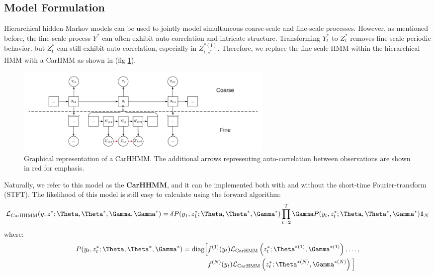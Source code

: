 

\subsection{Model Formulation}
\label{subsec:model_structure}

Hierarchical hidden Markov models can be used to jointly model simultaneous coarse-scale and fine-scale processes. However, as mentioned before, the fine-scale process $Y^*$ can often exhibit auto-correlation and intricate structure. Transforming $Y^*_t$ to $Z^*_t$ removes fine-scale periodic behavior, but $Z^*_t$ can still exhibit auto-correlation, especially in $Z_{t,s^*}^{*(1)}$. Therefore, we replace the fine-scale HMM within the hierarchical HMM with a CarHMM as shown in (fig \ref{fig:CarHHMM}).
%
\begin{figure}[ht]
	\centering
	\includegraphics[width=5in]{../Plots/CarHHMM.png}
	\caption{Graphical representation of a CarHHMM. The additional arrows representing auto-correlation between observations are shown in red for emphasis.}
	\label{fig:CarHHMM}
\end{figure}
%
Naturally, we refer to this model as the \textbf{CarHHMM}, and it can be implemented both with and without the short-time Fourier-transform (STFT). The likelihood of this model is still easy to calculate using the forward algorithm:
%
$$\calL_{\text{CarHHMM}}(y,z^*;\Theta,\Theta^*,\Gamma,\Gamma^*) = \delta P(y_1,z_1^*;\Theta,\Theta^*,\Gamma^*) \prod_{t=2}^T \Gamma P(y_t,z_t^*;\Theta,\Theta^*,\Gamma^*) \mathbf{1}_N$$
%
where:
%
\begin{align*}
P(y_t,z_t^*;\Theta,\Theta^*,\Gamma^*)  = \text{diag}\Big[&f^{(1)}(y_t)\calL_{\text{CarHMM}}\left(z_t^*;\Theta^{*(1)},\Gamma^{*(1)}\right), \ldots , \\
&f^{(N)}(y_t)\calL_{\text{CarHMM}}\left(z_t^*;\Theta^{*(N)},\Gamma^{*(N)}\right) \Big]
\end{align*}

